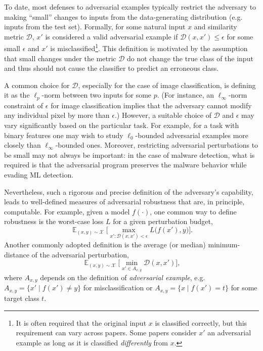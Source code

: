 \documentclass{article} %
\begin{document}
To date, most defenses to adversarial examples typically restrict the adversary to
making ``small'' changes to inputs from the data-generating
distribution (e.g. inputs from the test set).
%
Formally, for some natural input $x$ and similarity metric
$\mathcal{D}$, $x'$ is considered a valid adversarial example if
$\mathcal{D}(x, x')\leq \epsilon$ for some small $\epsilon$ and $x'$ is
misclassified\footnote{
  It is often required that the original input $x$ is classified
  correctly, but this requirement can vary across papers.
  Some papers consider $x'$ an adversarial example as long as it
  is classified \emph{differently} from $x$.}.
%
This definition is motivated by the assumption that small changes under
the metric $\mathcal{D}$ do not change the true class of the input and
thus should not cause the classifier to predict an erroneous class.

A common choice for $\mathcal{D}$, especially for the case of image
classification, is defining it as the $\ell_p$-norm between two
inputs for some $p$.
%
(For instance, an $\ell_\infty$-norm constraint of $\epsilon$ for image
classification implies that the adversary cannot modify any individual
pixel by more than $\epsilon$.)
However, a suitable choice of $\mathcal{D}$ and $\epsilon$
may vary significantly based on the particular task.
%
For example, for a task with binary features one may wish to
study $\ell_0$-bounded adversarial examples more closely
than $\ell_\infty$-bounded ones.
%
Moreover, restricting adversarial perturbations to be small may not
always be important: in the case of malware detection, what is
required is that the adversarial program preserves the malware
behavior while evading ML detection.

Nevertheless, such a rigorous and precise definition of the
adversary's capability, leads to well-defined measures of
adversarial robustness that are, in principle, computable.
%
For example, given a model $f(\cdot)$, one common way to define
robustness is the worst-case loss $L$ for a given perturbation budget,
\[
\mathop{\mathbb{E}}_{(x,y) \sim \mathcal{X}}\bigg[
  \max_{x' : \mathcal{D}(x,x') < \epsilon} L\big(f(x'),y\big) \bigg].
\]
Another commonly adopted definition is the average (or median)
minimum-distance of the adversarial perturbation,
\[
\mathop{\mathbb{E}}_{(x,y) \sim \mathcal{X}}\bigg[
  \min_{x' \in A_{x,y}} \mathcal{D}(x,x') \bigg],
\]
where $A_{x,y}$ depends on the definition of \emph{adversarial example},
e.g. $A_{x,y} = \{x' \mid f(x') \ne y\}$ for misclassification
or $A_{x,y} = \{x \mid f(x') = t\}$ for some target class $t$.
\end{document}
